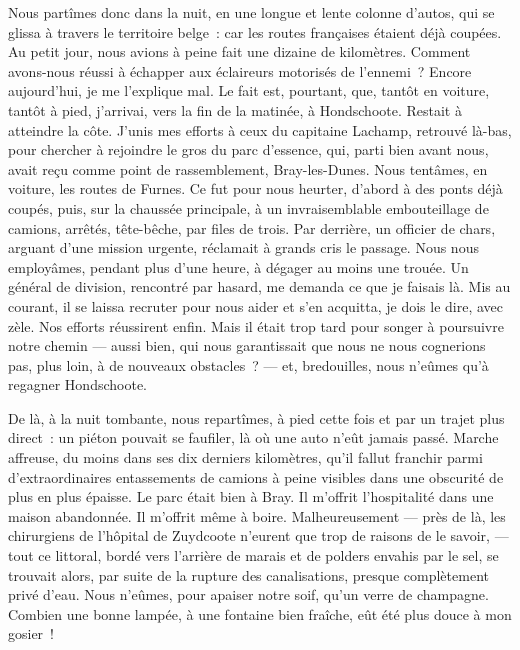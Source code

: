 \documentclass[french,twoside]{book} %
\begin{document}
Nous partîmes donc dans la nuit, en une longue et lente colonne d’autos, qui se glissa à travers le territoire belge : car les routes françaises étaient déjà coupées. Au petit jour, nous avions à peine fait une dizaine de kilomètres. Comment avons-nous réussi à échapper aux éclaireurs motorisés de l’ennemi ? Encore aujourd’hui, je me l’explique mal. Le fait est, pourtant, que, tantôt en voiture, tantôt à pied, j’arrivai, vers la fin de la matinée, à Hondschoote. Restait à atteindre la côte. J’unis mes efforts à ceux du capitaine Lachamp, retrouvé là-bas, pour chercher à rejoindre le gros du parc d’essence, qui, parti bien avant nous, avait reçu comme point de rassemblement, Bray-les-Dunes. Nous tentâmes, en voiture, les routes de Furnes. Ce fut pour nous heurter, d’abord à des ponts déjà coupés, puis, sur la chaussée principale, à un invraisemblable embouteillage de camions, arrêtés, tête-bêche, par files de trois. Par derrière, un officier de chars, arguant d’une mission urgente, réclamait à grands cris le passage. Nous nous employâmes, pendant plus d’une heure, à dégager au moins une trouée. Un général de division, rencontré par hasard, me demanda ce que je faisais là. Mis au courant, il se laissa recruter pour nous aider et s’en acquitta, je dois le dire, avec zèle. Nos efforts réussirent enfin. Mais il était trop tard pour songer à poursuivre notre chemin — aussi bien, qui nous garantissait que nous ne nous cognerions pas, plus loin, à de nouveaux obstacles ? — et, bredouilles, nous n’eûmes qu’à regagner Hondschoote.\par
De là, à la nuit tombante, nous repartîmes, à pied cette fois et par un trajet plus direct : un piéton pouvait se faufiler, là où une auto n’eût jamais passé. Marche affreuse, du moins dans ses dix derniers   kilomètres, qu’il fallut franchir parmi d’extraordinaires entassements de camions à peine visibles dans une obscurité de plus en plus épaisse. Le parc était bien à Bray. Il m’offrit l’hospitalité dans une maison abandonnée. Il m’offrit même à boire. Malheureusement — près de là, les chirurgiens de l’hôpital de Zuydcoote n’eurent que trop de raisons de le savoir, — tout ce littoral, bordé vers l’arrière de marais et de polders envahis par le sel, se trouvait alors, par suite de la rupture des canalisations, presque complètement privé d’eau. Nous n’eûmes, pour apaiser notre soif, qu’un verre de champagne. Combien une bonne lampée, à une fontaine bien fraîche, eût été plus douce à mon gosier !\par
\end{document}

